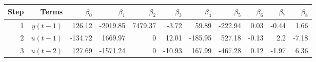 \begin{tabular}{rrrrrrrrrrr}
Step & Terms & $\beta_{0}$ & $\beta_{1}$ & $\beta_{2}$ & $\beta_{3}$ & $\beta_{4}$ & $\beta_{5}$ & $\beta_{6}$ & $\beta_{7}$ & $\beta_{8}$ \\ 
\hline 
1 & $y(t-1)$ & 126.12 & -2019.85 & 7479.37 & -3.72 & 59.89 & -222.94 & 0.03 & -0.44 & 1.66 \\ 
2 & $u(t-1)$ & -134.72 & 1669.97 & 0 & 12.01 & -185.95 & 527.18 & -0.13 & 2.2 & -7.18 \\ 
3 & $u(t-2)$ & 127.69 & -1571.24 & 0 & -10.93 & 167.99 & -467.28 & 0.12 & -1.97 & 6.36 \\ 
\hline 
\end{tabular}